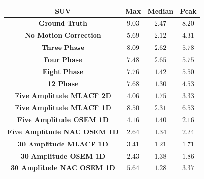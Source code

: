 \begin{table}
                \resizebox*{1.0\linewidth}{!}
                {
                    \begin{tabular}{||c|ccc||}
                        \hline
                        \textbf{\gls{SUV}}                                      & \textbf{Max}  & \textbf{Median}   & \textbf{Peak} \\
                        \hline
                        \textbf{Ground Truth}                                   & $9.03$        & $2.47$            & $8.20$ \\
                        \textbf{No Motion Correction}                           & $5.69$        & $2.12$            & $4.31$ \\
                        \hline
                        \textbf{Three Phase}                                    & $8.09$        & $2.62$            & $5.78$ \\
                        \textbf{Four Phase}                                     & $7.48$        & $2.65$            & $5.75$ \\
                        \textbf{Eight Phase}                                    & $7.76$        & $1.42$            & $5.60$ \\
                        \textbf{12 Phase}                                       & $7.68$        & $1.30$            & $4.53$ \\
                        \hline
                        \textbf{Five Amplitude \gls{MLACF} \gls{2D}}            & $4.06$        & $1.75$            & $3.33$ \\
                        \textbf{Five Amplitude \gls{MLACF} \gls{1D}}            & $8.50$        & $2.31$            & $6.63$ \\
                        \textbf{Five Amplitude \gls{OSEM} \gls{1D}}             & $4.16$        & $1.40$            & $2.16$ \\
                        \textbf{Five Amplitude \gls{NAC} \gls{OSEM} \gls{1D}}   & $2.64$        & $1.34$            & $2.24$ \\
                        \hline
                        \textbf{30 Amplitude \gls{MLACF} \gls{1D}}              & $3.41$        & $1.21$            & $1.71$ \\
                        \textbf{30 Amplitude \gls{OSEM} \gls{1D}}               & $2.43$        & $1.38$            & $1.86$ \\
                        \textbf{30 Amplitude \gls{NAC} \gls{OSEM} \gls{1D}}     & $5.64$        & $1.28$            & $3.37$ \\
                        \hline
                    \end{tabular}
                }
                \label{tab:evaluation_of_pet_ct_motion_correction_incorporating_motion_models_using_mlacf_and_complex_gating_schemes_results_suv}
            \end{table}
            
